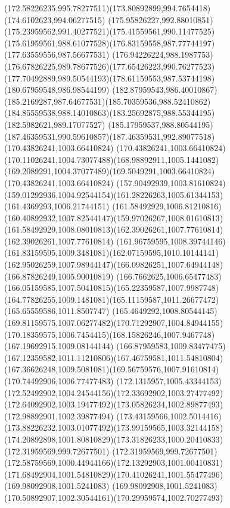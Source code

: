 {{		\curveto(172.58226235,995.78277511)(173.80892899,994.7654418)(174.6102623,994.06277515)
		\curveto(175.95826227,992.88010851)(175.23959562,991.40277521)(175.41559561,990.11477525)
		\curveto(175.61959561,988.61077528)(176.83159558,987.77744197)(177.63559556,987.56677531)
		\curveto(176.94226224,988.1987753)(176.67826225,989.78677526)(177.65426223,990.76277523)
		\curveto(177.70492889,989.50544193)(178.61159553,987.53744198)(180.67959548,986.98544199)
		\curveto(182.87959543,986.40010867)(185.2169287,987.64677531)(185.70359536,988.52410862)
		\curveto(184.85559538,988.14010863)(183.25692875,988.55344195)(182.5982621,989.17077527)
		\curveto(185.17959537,988.80544195)(187.46359531,990.59610857)(187.46359531,992.89077518)
		\moveto(170.43826241,1003.66410824)
		\curveto(170.43826241,1003.66410824)(170.11026241,1004.73077488)(168.98892911,1005.1441082)
		\curveto(169.2089291,1004.37077489)(169.5049291,1003.66410824)(170.43826241,1003.66410824)
		\moveto(157.90492939,1003.81610824)
		\curveto(159.01292936,1004.92544154)(161.28226263,1005.61344153)(161.4369293,1006.21744151)
		\curveto(161.58492929,1006.81210816)(160.40892932,1007.82544147)(159.97026267,1008.01610813)
		\curveto(161.58492929,1008.08010813)(162.39026261,1007.77610814)(162.39026261,1007.77610814)
		\curveto(161.96759595,1008.39744146)(161.83159595,1009.3481081)(162.07159595,1010.10144141)
		\curveto(162.95026259,1007.98944147)(166.09826251,1007.64944148)(166.87826249,1005.90010819)
		\curveto(166.7662625,1006.65477483)(166.05159585,1007.50410815)(165.22359587,1007.9987748)
		\curveto(164.77826255,1009.1481081)(165.11159587,1011.26677472)(165.65559586,1011.8507747)
		\curveto(165.4649292,1008.80544145)(169.81159575,1007.06277482)(170.71292907,1004.84944155)
		\curveto(170.18359575,1006.7454415)(168.15826246,1007.9467748)(167.19692915,1009.08144144)
		\curveto(166.87959583,1009.83477475)(167.12359582,1011.11210806)(167.46759581,1011.54810804)
		\curveto(167.36626248,1009.5081081)(169.56759576,1007.91610814)(170.74492906,1006.77477483)
		\curveto(172.1315957,1005.43344153)(172.52492902,1004.24544156)(172.33692902,1003.27477492)
		\curveto(172.64092902,1003.19477492)(173.05826234,1002.89877493)(172.98892901,1002.39877494)
		\curveto(173.43159566,1002.5014416)(173.88226232,1003.01077492)(173.99159565,1003.32144158)
		\curveto(174.20892898,1001.80810829)(173.31826233,1000.20410833)(172.31959569,999.72677501)
		\curveto(172.31959569,999.72677501)(172.58759569,1000.44944166)(172.13292903,1001.00410831)
		\curveto(171.68492904,1001.54810829)(170.41026241,1001.55477496)(169.98092908,1001.5241083)
		\curveto(169.98092908,1001.5241083)(170.50892907,1002.30544161)(170.29959574,1002.70277493)
}}
